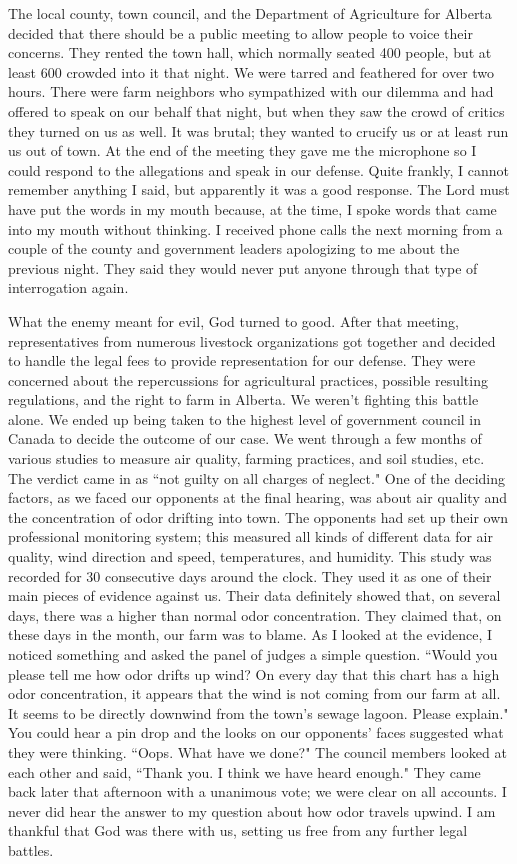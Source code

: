 \documentclass[oneside,12pt]{book}
\begin{document}
The local county, town council, and the Department of Agriculture for Alberta decided that there should be a public meeting to allow people to voice their concerns. They rented the town hall, which normally seated 400 people, but at least 600 crowded into it that night. We were tarred and feathered for over two hours. There were farm neighbors who sympathized with our dilemma and had offered to speak on our behalf that night, but when they saw the crowd of critics they turned on us as well. It was brutal; they wanted to crucify us or at least run us out of town. At the end of the meeting they gave me the microphone so I could respond to the allegations and speak in our defense. Quite frankly, I cannot remember anything I said, but apparently it was a good response. The Lord must have put the words in my mouth because, at the time, I spoke words that came into my mouth without thinking. I received phone calls the next morning from a couple of the county and government leaders apologizing to me about the previous night. They said they would never put anyone through that type of interrogation again. 

What the enemy meant for evil, God turned to good. After that meeting, representatives from numerous livestock organizations got together and decided to handle the legal fees to provide representation for our defense. They were concerned about the repercussions for agricultural practices, possible resulting regulations, and the right to farm in Alberta. We weren't fighting this battle alone. We ended up being taken to the highest level of government council in Canada to decide the outcome of our case. We went through a few months of various studies to measure air quality, farming practices, and soil studies, etc. The verdict came in as ``not guilty on all charges of neglect." One of the deciding factors, as we faced our opponents at the final hearing, was about air quality and the concentration of odor drifting into town. The opponents had set up their own professional monitoring system; this measured all kinds of different data for air quality, wind direction and speed, temperatures, and humidity. This study was recorded for 30 consecutive days around the clock. They used it as one of their main pieces of evidence against us. Their data definitely showed that, on several days, there was a higher than normal odor concentration. They claimed that, on these days in the month, our farm was to blame. As I looked at the evidence, I noticed something and asked the panel of judges a simple question. ``Would you please tell me how odor drifts up wind? On every day that this chart has a high odor concentration, it appears that the wind is not coming from our farm at all. It seems to be directly downwind from the town's sewage lagoon. Please explain." You could hear a pin drop and the looks on our opponents' faces suggested what they were thinking. ``Oops. What have we done?" The council members looked at each other and said, ``Thank you. I think we have heard enough." They came back later that afternoon with a unanimous vote; we were clear on all accounts. I never did hear the answer to my question about how odor travels upwind. I am thankful that God was there with us, setting us free from any further legal battles. 
\end{document}
